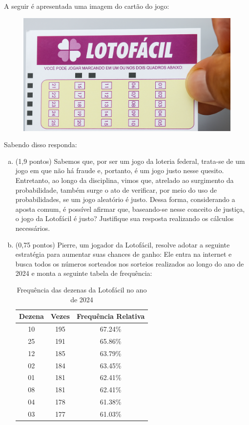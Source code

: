 \documentclass[12pt]{article}
\begin{document}
A seguir é apresentada uma imagem do cartão do jogo:

\begin{figure}[H]
    \centering
    \includegraphics[width=0.5\linewidth]{figures/lotofacil.png}
\end{figure}

Sabendo disso responda:

\begin{enumerate}[a)]
    \item (1,9 pontos) Sabemos que, por ser um jogo da loteria federal, trata-se de um jogo em que não há fraude e, portanto, é um jogo justo nesse quesito. Entretanto, ao longo
    da disciplina, vimos que, atrelado ao surgimento da probabilidade, também surge o ato de verificar, por meio do uso de probabilidades, se um jogo aleatório 
    é justo. Dessa forma, considerando a aposta comum, é possível afirmar que, baseando-se nesse conceito de justiça, o jogo da Lotofácil é justo? Justifique sua resposta realizando os cálculos 
    necessários. 
    \item (0,75 pontos) Pierre, um jogador da Lotofácil, resolve adotar a seguinte estratégia para aumentar suas chances de ganho: Ele entra na internet e busca todos os números sorteados
    nos sorteios realizados ao longo do ano de 2024 e monta a seguinte tabela de frequência:
\begin{table}[H]
\centering
\caption{Frequência das dezenas da Lotofácil no ano de 2024}
\begin{tabular}{|c|c|c|}
\hline
\textbf{Dezena} & \textbf{Vezes} & \textbf{Frequência Relativa} \\ \hline
10 & 195 & 67.24\% \\ \hline
25 & 191 & 65.86\% \\ \hline
12 & 185 & 63.79\% \\ \hline
02 & 184 & 63.45\% \\ \hline
01 & 181 & 62.41\% \\ \hline
08 & 181 & 62.41\% \\ \hline
04 & 178 & 61.38\% \\ \hline
03 & 177 & 61.03\% \\ \hline

\end{tabular}
\end{table}
\end{enumerate}
\end{document}
